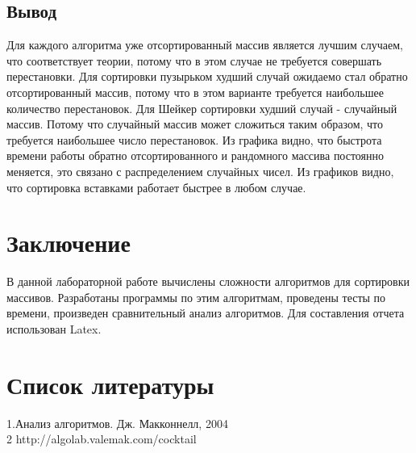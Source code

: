 \documentclass[12pt]{article}
\begin{document}
\subsection{Вывод}
Для каждого алгоритма уже отсортированный массив является лучшим случаем, что соответствует теории, потому что в этом случае не требуется совершать перестановки. 
Для сортировки пузырьком худший случай ожидаемо стал обратно отсортированный массив, потому что в этом варианте требуется наибольшее количество перестановок. 
Для Шейкер сортировки худший случай - случайный массив. Потому что случайный массив может сложиться таким образом, что требуется наибольшее число перестановок. Из графика видно, что быстрота времени работы обратно отсортированного и рандомного массива постоянно меняется, это связано с распределением случайных чисел. 
Из графиков видно, что сортировка вставками работает быстрее в любом случае.
\newpage
\section{Заключение}
В данной лабораторной работе вычислены сложности алгоритмов для сортировки массивов. Разработаны программы по этим алгоритмам, проведены тесты по времени, произведен сравнительный анализ алгоритмов. Для составления отчета использован Latex.
\newpage
\section{Список литературы}
1.Анализ алгоритмов. Дж. Макконнелл, 2004\\
2 http://algolab.valemak.com/cocktail
\end{document}
